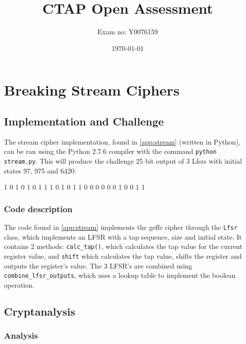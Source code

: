 \documentclass[british,10pt,a4paper]{article}
\begin{document}
\title{CTAP Open Assessment}
\author{Exam no: Y0076159}
\date{\today}
\maketitle
\tableofcontents
\clearpage
\section{Breaking Stream Ciphers}
\subsection{Implementation and Challenge}
The stream cipher implementation, found in \autoref{app:stream} (written in Python),
can be ran using the Python 2.7.6 compiler with the command \lstinline{python stream.py}. This will produce the
challenge 25 bit output of 3 Lfsrs with initial states 97, 975 and 6420:

1 0 1 0 1 0 1 1 1 0 1 0 1 1 0 0 0 0 0 0 1 0 0 1 1

\subsubsection{Code description}
The code found in \autoref{app:stream} implements the geffe cipher through the \lstinline{Lfsr} class, which implements an LFSR with a tap sequence, size and initial state. It contains 2 methods:
\lstinline{calc_tap()}, which calculates the tap value for the current register value, and \lstinline{shift} which
calculates the tap value, shifts the register and outputs the register's value. The 3 LFSR's are combined using
\lstinline{combine_lfsr_outputs}, which uses a lookup table to implement the boolean operation.

\subsection{Cryptanalysis}
\subsubsection{Analysis}
\end{document}
